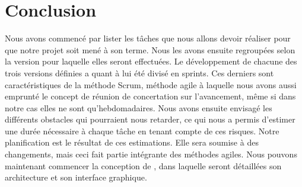 \section{Conclusion}
    \label{sec:conclusion}

    Nous avons commencé par lister les tâches que nous allons devoir réaliser pour que notre projet soit mené à son terme. Nous les avons ensuite regroupées selon la version pour laquelle elles seront effectuées. Le développement de chacune des trois versions définies a quant à lui été divisé en sprints. Ces derniers sont caractéristiques de la méthode Scrum, méthode agile à laquelle nous avons aussi emprunté le concept de réunion de concertation sur l'avancement, même si dans notre cas elles ne sont qu'hebdomadaires. Nous avons ensuite envisagé les différents obstacles qui pourraient nous retarder, ce qui nous a permis d'estimer une durée nécessaire à chaque tâche en tenant compte de ces risques. Notre planification est le résultat de ces estimations. Elle sera soumise à des changements, mais ceci fait partie intégrante des méthodes agiles. Nous pouvons maintenant commencer la conception de \glasir{}, dans laquelle seront détaillées son architecture et son interface graphique.